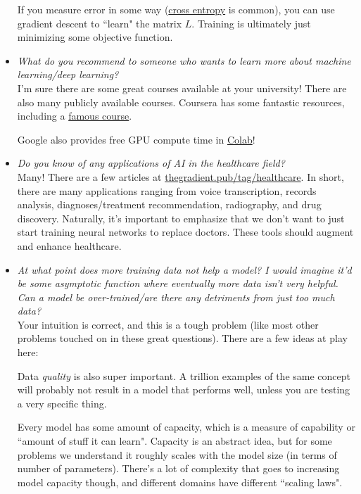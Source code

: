 \documentclass[11pt]{homework}
\begin{document}
\begin{itemize}
If you measure error in some way (\href{https://en.wikipedia.org/wiki/Cross_entropy}{cross entropy} is common), you can use gradient descent to ``learn" the matrix $L$. Training is ultimately just minimizing some objective function. 

\item {\em What do you recommend to someone who wants to learn more about machine learning/deep learning?} \\
I'm sure there are some great courses available at your university! There are also many publicly available courses. Coursera has some fantastic resources, including a \href{https://www.coursera.org/learn/machine-learning }{famous course}.

Google also provides free GPU compute time in \href{https://colab.research.google.com/}{Colab}!

\item {\em Do you know of any applications of AI in the healthcare field?} \\
Many! There are a few articles at \href{https://thegradient.pub/tag/healthcare/}{thegradient.pub/tag/healthcare}. In short, there are many applications ranging from voice transcription, records analysis, diagnoses/treatment recommendation, radiography, and drug discovery. Naturally, it's important to emphasize that we don't want to just start training neural networks to replace doctors. These tools should augment and enhance healthcare.

\item {\em At what point does more training data not help a model? I would imagine it'd be some asymptotic function where eventually more data isn't very helpful. Can a model be over-trained/are there any detriments from just too much data?} \\
Your intuition is correct, and this is a tough problem (like most other problems touched on in these great questions). There are a few ideas at play here:

Data {\em quality} is also super important. A trillion examples of the same concept will probably not result in a model that performs well, unless you are testing a very specific thing.

Every model has some amount of capacity, which is a measure of capability or ``amount of stuff it can learn". Capacity is an abstract idea, but for some problems we understand it roughly scales with the model size (in terms of number of parameters). There's a lot of complexity that goes to increasing model capacity though, and different domains have different ``scaling laws".


\end{itemize}
\end{document}
